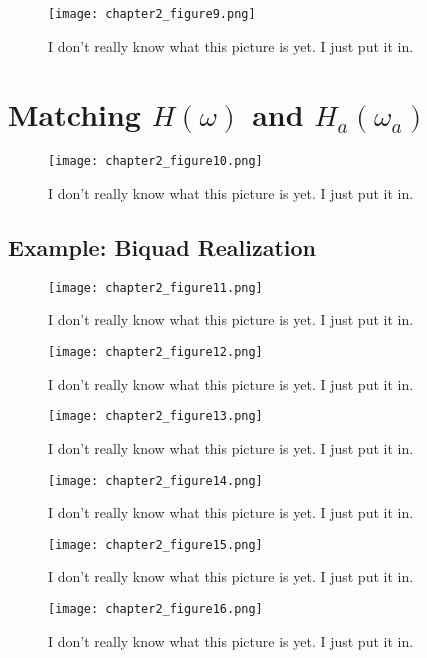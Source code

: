 \documentclass[11pt,fleqn]{book} %
\begin{document}
\begin{figure}[h]
  \centering\texttt{[image: chapter2\_figure9.png]}
  \caption{I don't really know what this picture is yet. I just put it in.}
\end{figure}

\section{Matching $H(\omega)$ and $H_a(\omega_a)$}

\begin{figure}[h]
  \centering\texttt{[image: chapter2\_figure10.png]}
  \caption{I don't really know what this picture is yet. I just put it in.}
\end{figure}

\subsection{Example: Biquad Realization}

\begin{figure}[h]
  \centering\texttt{[image: chapter2\_figure11.png]}
  \caption{I don't really know what this picture is yet. I just put it in.}
\end{figure}

\begin{figure}[h]
  \centering\texttt{[image: chapter2\_figure12.png]}
  \caption{I don't really know what this picture is yet. I just put it in.}
\end{figure}
\begin{figure}[h]
  \centering\texttt{[image: chapter2\_figure13.png]}
  \caption{I don't really know what this picture is yet. I just put it in.}
\end{figure}
\begin{figure}[h]
  \centering\texttt{[image: chapter2\_figure14.png]}
  \caption{I don't really know what this picture is yet. I just put it in.}
\end{figure}
\begin{figure}[h]
  \centering\texttt{[image: chapter2\_figure15.png]}
  \caption{I don't really know what this picture is yet. I just put it in.}
\end{figure}
\begin{figure}[h]
  \centering\texttt{[image: chapter2\_figure16.png]}
  \caption{I don't really know what this picture is yet. I just put it in.}
\end{figure}
\end{document}
